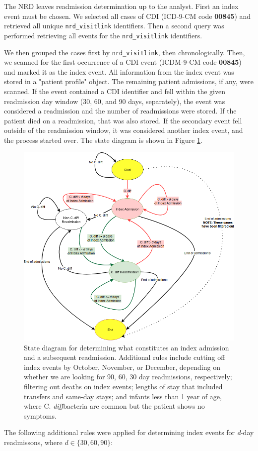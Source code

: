 \documentclass[12pt]{ociamthesis}\usepackage[]{graphicx}\usepackage[]{color}
\newcommand{\cdiff}{C. \textit{diff}}
\begin{document}
The NRD leaves readmission determination up to the analyst. First an index event must be chosen. 
We selected all cases of CDI (ICD-9-CM code \textbf{00845}) and retrieved all unique \texttt{nrd\_visitlink}
identifiers. Then a second query was performed retrieving all events for the \texttt{nrd\_visitlink} identifiers.


We then grouped the cases first by \texttt{nrd\_visitlink}, then chronologically. Then, we scanned for the first
occurrence of a CDI event (ICDM-9-CM code \textbf{00845}) and marked it as the index event. All information from
the index event was stored in a "patient profile" object. The remaining patient admissions, if any, were scanned.
If the event contained a CDI identifier and fell within the given readmission day window (30, 60, and 90 days, separately),
the event was considered a readmission and the number of readmissions were stored. If the patient died on a readmission,
that was also stored. If the secondary event fell outside of the readmission window, it was considered another index event, 
and the process started over. The state diagram is shown in Figure \ref{fig:readmission-state-diagram}.

\begin{figure}[h]
\centering
\includegraphics[scale=0.5]{readmission-state-diagram.png} 
\caption{State diagram for determining what constitutes an index admission and a subsequent readmission.
Additional rules include cutting off index events by October, November, or December, depending on whether we are looking for 90, 60, 30 day readmissions, respectively;
filtering out deaths on index events;
lengths of stay that included transfers and same-day stays;
and infants less than 1 year of age, where \cdiff bacteria are common but the patient shows no symptoms.}
\label{fig:readmission-state-diagram} 
\end{figure}
The following additional rules were applied for determining index events for \textit{d}-day readmissons, where $d \in \{30, 60, 90\}$:
\end{document}
